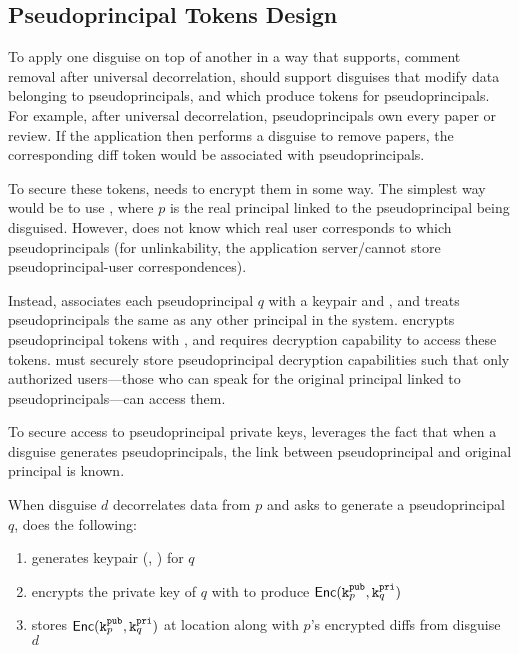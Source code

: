 \subsection{Pseudoprincipal Tokens Design}

To apply one disguise on top of another in a way that supports, \eg comment removal after universal
decorrelation, \sys should support disguises that modify data belonging to pseudoprincipals, and which
produce tokens for pseudoprincipals.
%
For example, after universal decorrelation, pseudoprincipals own every paper or review. If the
application then performs a disguise to remove papers, the corresponding diff token would be
associated with pseudoprincipals.

To secure these tokens, \sys needs to encrypt them in some way. The simplest way would be to use
, where $p$ is the real principal linked to the pseudoprincipal being disguised.
However, \sys does not know which real user corresponds to which pseudoprincipals (for
unlinkability, the application server/\sys cannot store pseudoprincipal-user correspondences). 

Instead, \sys associates each pseudoprincipal $q$ with a keypair  and , and treats
pseudoprincipals the same as any other principal in the system. \sys encrypts pseudoprincipal tokens
with , and requires decryption capability  to access these tokens. \sys must
securely store pseudoprincipal decryption capabilities  such that only authorized
users---those who can speak for the original principal linked to pseudoprincipals---can
access them.

To secure access to pseudoprincipal private keys, \sys leverages the fact that 
when a disguise generates pseudoprincipals, the link between pseudoprincipal and original principal
is known. 

When disguise $d$ decorrelates data from $p$ and asks \sys to generate a pseudoprincipal $q$, \sys does the following: 
\begin{enumerate}
    \item \sys generates keypair (, ) for $q$
    \item encrypts the private key of $q$ with  to produce $\mathsf{Enc}(\texttt{\ensuremath{\texttt{k}^{\text{pub}}_{p}}}, \texttt{\ensuremath{\texttt{k}^{\text{pri}}_{q}}})$
    \item stores $\mathsf{Enc}(\texttt{\ensuremath{\texttt{k}^{\text{pub}}_{p}}}, \texttt{\ensuremath{\texttt{k}^{\text{pri}}_{q}}})$ at location  along with $p$'s encrypted diffs from disguise $d$
\end{enumerate}

